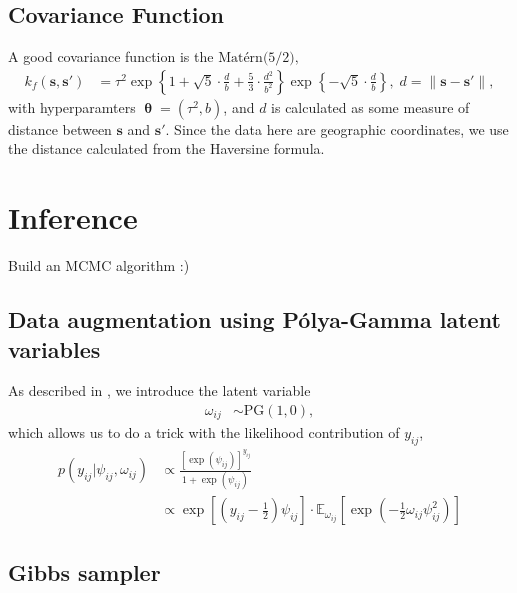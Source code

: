 \documentclass[11pt]{article}
\newcommand{\1}{\mathbf{1}}
\newcommand{\0}{\mathbf{0}}
\begin{document}
\subsection{Covariance Function}

A good covariance function is the $\text{Mat\'{e}rn(5/2)},$
%
%
%
\begin{align*}
	k_f(\mathbf{s},\mathbf{s}') &= \tau^2 \exp\left\{ 1 + \sqrt{5} \cdot \frac{d}{b} + \frac{5}{3} \cdot \frac{d^2}{b^2} \right\} \exp \left\{ -\sqrt{5} \cdot \frac{d}{b} \right \} , \; d = \| \mathbf{s} - \mathbf{s}' \|, 
\end{align*}
%
%
with hyperparamters $\bm{\uptheta} = (\tau^2, b)$, and $d$ is calculated as some measure of distance between $\mathbf{s}$ and $\mathbf{s}'.$ Since the data here are geographic coordinates, we use the distance calculated from the Haversine formula. 



\section{Inference}\label{Inference}

Build an MCMC algorithm :)

\subsection{Data augmentation using P\'{o}lya-Gamma latent variables}

As described in \cite{PG}, we introduce the latent variable
%
%
%
\begin{align*}
	\omega_{ij} &\sim \text{PG}(1, 0),
\end{align*}
%
%
%
which allows us to do a trick with the likelihood contribution of $y_{ij}$,
%
%
%
\begin{align*}
	p(y_{ij} | \psi_{ij}, \omega_{ij}) &\propto \frac{\left[ \exp(\psi_{ij}) \right]^{y_{ij}}}{1 + \exp(\psi_{ij})} \\
	&\propto \exp \left[ \left(y_{ij} - \frac{1}{2}\right) \psi_{ij} \right] \cdot \mathbb{E}_{\omega_{ij}}\left[ \exp \left( - \frac{1}{2} \omega_{ij} \psi_{ij}^2  \right) \right]
\end{align*}

\subsection{Gibbs sampler}
\end{document}
